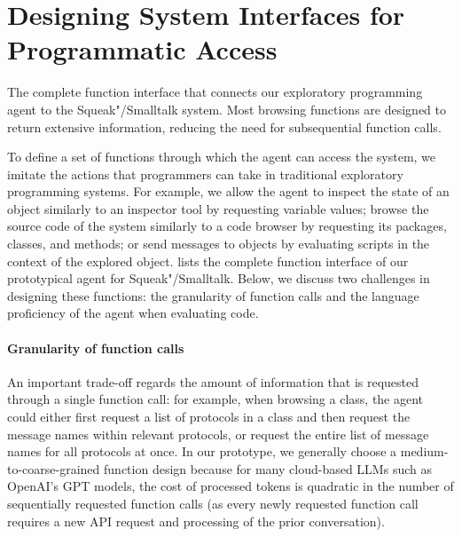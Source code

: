 
\section{Designing System Interfaces for Programmatic Access}
\label{sec:agent/interfaces}

\begin{table}
	\centering
	\footnotesize
	\caption[The function interface that connects our exploratory programming agent to the Squeak"/Smalltalk system.]{
		The complete function interface that connects our exploratory programming agent to the Squeak"/Smalltalk system.
		Most browsing functions are designed to return extensive information, reducing the need for subsequential function calls.
	}
	\label{tab:agent/functions/interface}
\end{table}

To define a set of functions through which the agent can access the system, we imitate the actions that programmers can take in traditional exploratory programming systems.
For example, we allow the agent to inspect the state of an object similarly to an inspector tool by requesting variable values; browse the source code of the system similarly to a code browser by requesting its packages, classes, and methods; or send messages to objects by evaluating scripts in the context of the explored object.
 lists the complete function interface of our prototypical agent for Squeak"/Smalltalk.
Below, we discuss two challenges in designing these functions: the granularity of function calls and the language proficiency of the agent when evaluating code.

\paragraph{Granularity of function calls}
An important trade-off regards the amount of information that is requested through a single function call:
for example, when browsing a class, the agent could either first request a list of protocols in a class and then request the message names within relevant protocols, or request the entire list of message names for all protocols at once.
In our prototype, we generally choose a medium-to-coarse-grained function design because for many cloud-based LLMs such as OpenAI's GPT models, the cost of processed tokens is quadratic in the number of sequentially requested function calls (as every newly requested function call requires a new API request and processing of the prior conversation).

